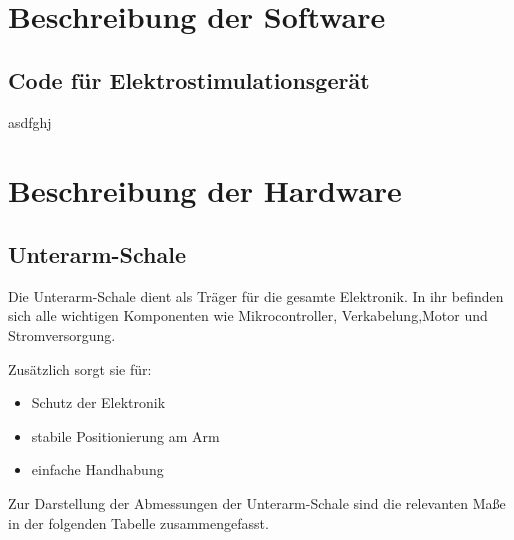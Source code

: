 \documentclass{article}
\begin{document}
\section{Beschreibung der Software}
\subsection{Code für Elektrostimulationsgerät}
asdfghj
\newpage
\section {Beschreibung der Hardware}

\subsection{Unterarm-Schale}

Die Unterarm-Schale dient als Träger für die gesamte Elektronik. In ihr befinden sich alle wichtigen Komponenten wie Mikrocontroller, Verkabelung,Motor und Stromversorgung.

Zusätzlich sorgt sie für:
\begin{itemize}
\item Schutz der Elektronik
\item stabile Positionierung am Arm
\item einfache Handhabung
\end{itemize}
Zur Darstellung der Abmessungen der Unterarm-Schale sind die relevanten Maße in der folgenden Tabelle zusammengefasst.
\newpage
\end{document}
